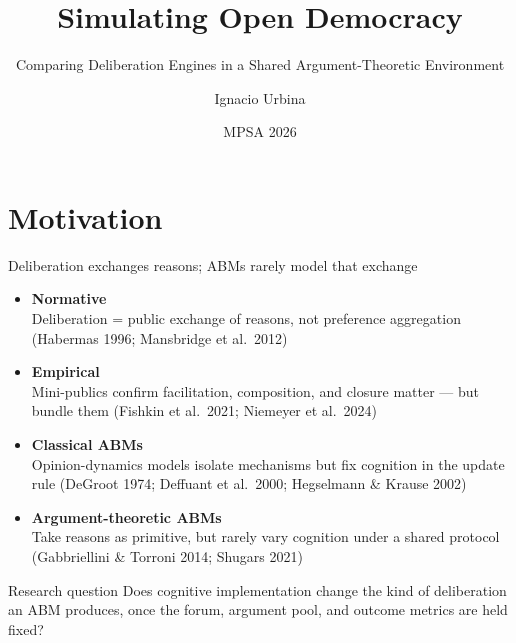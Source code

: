 \documentclass[aspectratio=169,11pt]{beamer}
\title{Simulating Open Democracy}
\subtitle{Comparing Deliberation Engines in a Shared Argument-Theoretic Environment}
\author{Ignacio Urbina}
\institute{Stony Brook University}
\date{MPSA 2026}
\begin{document}
\begin{frame}
\titlepage
\end{frame}

\section{Motivation}

\begin{frame}{Deliberation exchanges reasons; ABMs rarely model that exchange}

\begin{itemize}
    \item \textbf{Normative} \\
    {\small Deliberation = public exchange of reasons, not preference aggregation (Habermas 1996; Mansbridge et al.\ 2012)}
    \item \textbf{Empirical} \\
    {\small Mini-publics confirm facilitation, composition, and closure matter --- but bundle them (Fishkin et al.\ 2021; Niemeyer et al.\ 2024)}
    \item \textbf{Classical ABMs} \\
    {\small Opinion-dynamics models isolate mechanisms but fix cognition in the update rule (DeGroot 1974; Deffuant et al.\ 2000; Hegselmann \& Krause 2002)}
    \item \textbf{Argument-theoretic ABMs} \\
    {\small Take reasons as primitive, but rarely vary cognition under a shared protocol (Gabbriellini \& Torroni 2014; Shugars 2021)}
\end{itemize}

\vspace{0.3cm}
\begin{alertblock}{Research question}
Does cognitive implementation change the kind of deliberation an ABM produces, once the forum, argument pool, and outcome metrics are held fixed?
\end{alertblock}

\end{frame}

\end{document}
